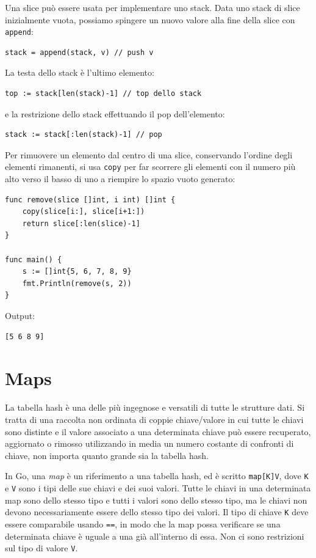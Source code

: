 Una slice può essere usata per implementare uno stack.
Data uno stack di slice inizialmente vuota, possiamo spingere un nuovo valore alla fine della slice con \verb|append|:
\begin{lstlisting}[frame=single, label={lst:lstlisting3-2.12}]
stack = append(stack, v) // push v
\end{lstlisting}
La testa dello stack è l'ultimo elemento:
\begin{lstlisting}[frame=single, label={lst:lstlisting3-2.13}]
top := stack[len(stack)-1] // top dello stack
\end{lstlisting}
e la restrizione dello stack effettuando il pop dell'elemento:
\begin{lstlisting}[frame=single, label={lst:lstlisting3-2.14}]
stack := stack[:len(stack)-1] // pop
\end{lstlisting}
Per rimuovere un elemento dal centro di una slice, conservando l'ordine degli elementi rimanenti, si usa \verb|copy| per far scorrere gli elementi con il numero più alto verso il basso di uno a riempire lo spazio vuoto generato:
\begin{lstlisting}[frame=single, label={lst:lstlisting3-2.15}]
func remove(slice []int, i int) []int {
    copy(slice[i:], slice[i+1:])
    return slice[:len(slice)-1]
}

func main() {
    s := []int{5, 6, 7, 8, 9}
    fmt.Println(remove(s, 2))
}
\end{lstlisting}
Output:
\begin{lstlisting}[language=bash, frame=L, label={lst:lstlisting3-2.16}]
[5 6 8 9]
\end{lstlisting}


\section{Maps}
\label{sec:maps}%
La tabella hash è una delle più ingegnose e versatili di tutte le strutture dati.
Si tratta di una raccolta non ordinata di coppie chiave/valore in cui tutte le chiavi sono distinte e il valore associato a una determinata chiave può essere recuperato, aggiornato o rimosso utilizzando in media un numero costante di confronti di chiave, non importa quanto grande sia la tabella hash.

In Go, una \textit{map} è un riferimento a una tabella hash, ed è scritto \verb|map[K]V|, dove \verb|K| e \verb|V| sono i tipi delle sue chiavi e dei suoi valori.
Tutte le chiavi in una determinata map sono dello stesso tipo e tutti i valori sono dello stesso tipo, ma le chiavi non devono necessariamente essere dello stesso tipo dei valori.
Il tipo di chiave \verb|K| deve essere comparabile usando \verb|==|, in modo che la map possa verificare se una determinata chiave è uguale a una già all'interno di essa.
Non ci sono restrizioni sul tipo di valore \verb|V|.


